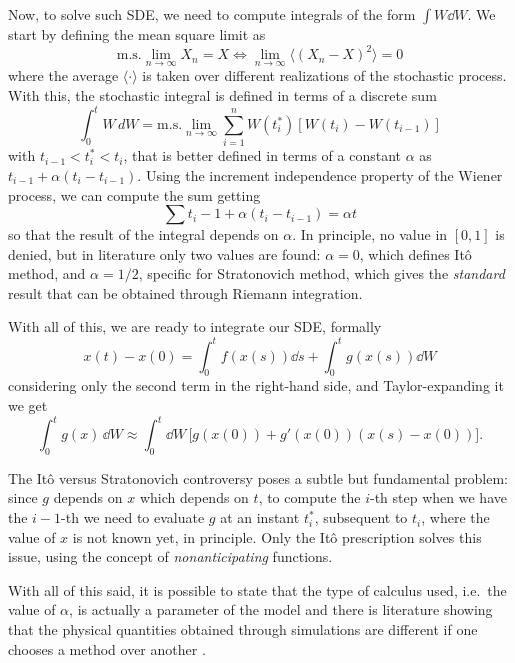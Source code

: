 \documentclass[../../master_thesis_np.tex]{subfiles}
\begin{document}
		Now, to solve such SDE, we need to compute integrals of the form $\int W \dd{W}$. 
		We start by defining the mean square limit as
		\begin{equation} 
			\text{m.s.} \lim_{n \to \infty} X_n = X \iff \lim_{n \to \infty} \langle(X_n - X)^2\rangle = 0 
		\end{equation}
		where the average $\langle \cdot \rangle$ is taken over different realizations of the stochastic process. 
		With this, the stochastic integral is defined in terms of a discrete sum
		\begin{equation} 
			\int_0^t W \, dW = \text{m.s.} \lim_{n \to \infty} \sum_{i=1}^n W(t_i^*) \left[ W(t_i) - W(t_{i-1}) \right] 
		\end{equation}
		with $t_{i-1} < t_i^* < t_i$, that is better defined in terms of a constant $\alpha$ as $t_{i-1}+\alpha (t_i - t_{i-1})$. 
		Using the increment independence property of the Wiener process, we can compute the sum getting 
		\begin{equation} 
			\sum t_i-1 + \alpha(t_i - t_{i-1}) = \alpha t 
		\end{equation}
		so that the result of the integral depends on $\alpha$. 
		In principle, no value in $[0,1]$ is denied, but in literature only two values are found: $\alpha = 0$, which defines Itô method, and $\alpha = 1/2$, specific for Stratonovich method, which gives the \emph{standard} result that can be obtained through Riemann integration. 
		
		With all of this, we are ready to integrate our SDE, formally
		\begin{equation} 
			x(t) - x(0) = \int_{0}^{t} f(x(s)) \dd{s} + \int_{0}^{t} g(x(s)) \dd{W}
		\end{equation} 
		considering only the second term in the right-hand side, and Taylor-expanding it we get
		\begin{equation} 
			\int_0^t g(x) \, \dd{W} \approx \int_0^t \dd{W} \, \big[g(x(0)) + g'(x(0))(x(s) - x(0))\big] .
		 \end{equation}
		 
		The Itô versus Stratonovich controversy poses a subtle but fundamental problem: since $g$ depends on $x$ which depends on $t$, to compute the $i$-th step when we have the $i-1$-th we need to evaluate $g$ at an instant $t_i^*$, subsequent to $t_i$, where the value of $x$ is not known yet, in principle. 
		Only the Itô prescription solves this issue, using the concept of \emph{nonanticipating} functions.
		 
		With all of this said, it is possible to state that the type of calculus used, i.e.~the value of $\alpha$, is actually a parameter of the model and there is literature showing that the physical quantities obtained through simulations are different if one chooses a method over another \cite{mannella_ito_2012}.	
		
\end{document}
